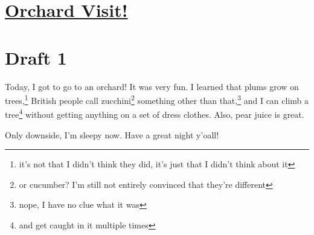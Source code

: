 \documentclass[12pt]{article}[titlepage]
\newcommand{\1}{\={a}}
\newcommand{\2}{\={e}}
\newcommand{\3}{\={\i}}
\newcommand{\4}{\=o}
\newcommand{\5}{\=u}
\newcommand{\6}{\={A}}
\renewcommand{\,}{\textsuperscript{,}}
\begin{document}
\doublespacing
\section{\href{orchard-visit.html}{Orchard Visit!}}
\section{Draft 1}
Today, I got to go to an orchard!
It was very fun.
I learned that plums grow on trees,\footnote{it's not that I didn't think they did, it's just that I didn't think about it} British people call zucchini\footnote{or cucumber? I'm still not entirely convinced that they're different} something other than that,\footnote{nope, I have no clue what it was} and I can climb a tree\footnote{and get caught in it multiple times} without getting anything on a set of dress clothes.
Also, pear juice is great.

Only downside, I'm sleepy now.
Have a great night y'oall!
\end{document}
